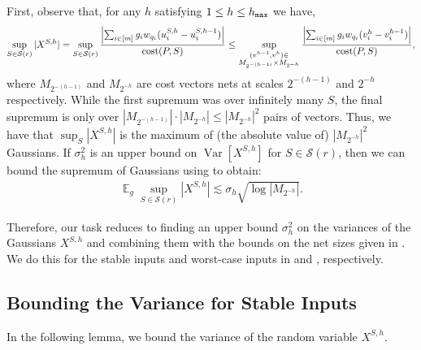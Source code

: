 \documentclass[11pt]{article}
\theoremstyle{restate}
\theoremstyle{definition}
\DeclareMathOperator*{\var}{\mathrm{Var}}
\newcommand{\E}{\mathop{\mathbb{E}}}
\newcommand{\cost}{\textnormal{cost}}
\newcommand{\uq}[2]{u^{#1}_{#2}} %
\newcommand{\inSR}{\in \mathcal{S}(r)}
\newcommand{\hmax}{h_\ensuremath{\textnormal{\texttt{max}}}}
\begin{document}
First, observe that, for any $h$ satisfying $1 \leq h \leq \hmax$ we have,
\begin{align*}
 \sup_{S\inSR} |X^{S,h}| =  \sup_{S\inSR} \frac{\left\lvert\sum_{i \in [m]}g_i w_{q_i} (\uq{S,h}{i} - \uq{S,h-1}{i})\right\rvert}{\cost(P,S)} 
    \leq \sup_{\substack{(v^{h-1}, v^{h}) \in \\ M_{2^{-(h-1)}} \times M_{2^{-h}}}} \frac{\left\lvert \sum_{i \in [m]}g_i w_{q_i} (v_i^h - v_i^{h-1}) \right\rvert}{\cost(P,S)},
\end{align*}
where $M_{2^{-(h-1)}}$ and $M_{2^{-h}}$ are cost vectors nets at scales $2^{-(h-1)}$ and $2^{-h}$ respectively. While the first supremum was over infinitely many $S$, the final supremum is only over $|M_{2^{-(h-1)}}| \cdot |M_{2^{-h}}| \leq |M_{2^{-h}}|^2$ pairs of vectors. Thus, we have that $\sup_S |X^{S,h}|$ is the maximum of (the absolute value of) $|M_{2^{-h}}|^2$ Gaussians. If $\sigma_h^2$ is an upper bound on $\var[X^{S,h}]$ for $S \in \mathcal{S}(r)$, then we can bound the supremum of Gaussians using  to obtain:
\begin{align}\label{eq: combine-net-variance}
    \E_g \sup_{S\inSR} |X^{S,h}| \lesssim \sigma_h \sqrt{ \log |M_{2^{-h}}|}.
\end{align}



Therefore, our task reduces to finding an upper bound $\sigma_h^2$ on the variances of the Gaussians $X^{S,h}$ and combining them with the bounds on the net sizes given in . We do this for the stable inputs and worst-case inputs in   and , respectively.



\subsection{Bounding the Variance for Stable Inputs}\label{sec: variance-stable}


In the following lemma, we bound the variance of the random variable $X^{S,h}$.
\end{document}
